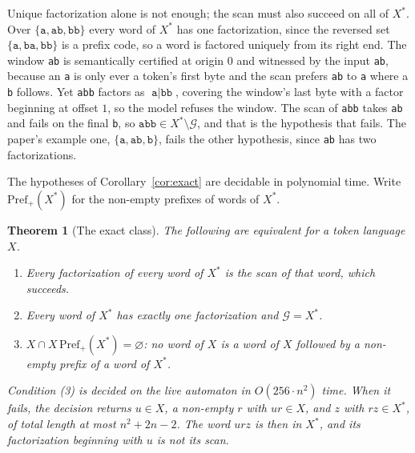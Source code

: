 \documentclass[11pt,a4paper]{article}
\theoremstyle{definition}
\theoremstyle{plain}
\newtheorem{theorem}{Theorem}
\newcommand{\code}[1]{\texttt{#1}}
\begin{document}
Unique factorization alone is not enough; the scan must also succeed on all of $X^*$. Over
$\{\code{a}, \code{ab}, \code{bb}\}$ every word of $X^*$ has one factorization, since the reversed set
$\{\code{a}, \code{ba}, \code{bb}\}$ is a prefix code, so a word is factored uniquely from its right end. The window
\code{ab} is semantically certified at origin $0$ and witnessed by the input \code{ab}, because an \code{a} is only ever
a token's first byte and the scan prefers \code{ab} to \code{a} where a \code{b} follows. Yet \code{abb} factors as
$\code{a} \mid \code{bb}$, covering the window's last byte with a factor beginning at offset $1$, so the model refuses
the window. The scan of \code{abb} takes \code{ab} and fails on the final \code{b}, so
$\code{abb} \in X^* \setminus \mathcal{G}$, and that is the hypothesis that fails. The paper's example one,
$\{\code{a}, \code{ab}, \code{b}\}$, fails the other hypothesis, since \code{ab} has two factorizations.

The hypotheses of Corollary~\ref{cor:exact} are decidable in polynomial time. Write $\mathrm{Pref}_+(X^*)$ for the
non-empty prefixes of words of $X^*$.

\begin{theorem}[The exact class]
\label{thm:agreement}
The following are equivalent for a token language $X$.
\begin{enumerate}
\item Every factorization of every word of $X^*$ is the scan of that word, which succeeds.
\item Every word of $X^*$ has exactly one factorization and $\mathcal{G} = X^*$.
\item $X \cap X\, \mathrm{Pref}_+(X^*) = \varnothing$: no word of $X$ is a word of $X$ followed by a non-empty prefix of
a word of $X^*$.
\end{enumerate}
Condition (3) is decided on the live automaton in $O(256 \cdot n^2)$ time. When it fails, the decision returns
$u \in X$, a non-empty $r$ with $u r \in X$, and $z$ with $r z \in X^*$, of total length at most $n^2 + 2n - 2$. The
word $u r z$ is then in $X^*$, and its factorization beginning with $u$ is not its scan.
\end{theorem}
\end{document}
